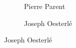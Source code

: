 \begin{frame}[plain]
\begin{figure}[h]
\begin{subfigure}{0.3\textwidth}
	\captionsetup{labelformat=empty}
	\centering
	\caption{Pierre Parent}
	\end{subfigure} \hspace{0.05cm}
	\begin{subfigure}{0.3\textwidth}
	\captionsetup{labelformat=empty}
	\centering
	\caption{Joseph Oesterl\'e}
	\end{subfigure}
	\end{figure}
\end{frame}





